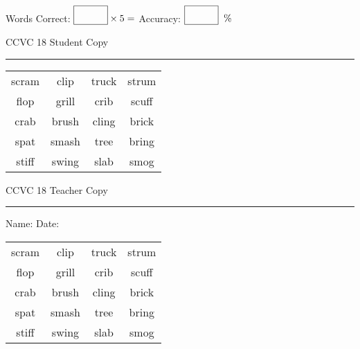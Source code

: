 \documentclass{memoir}
\begin{document}
\normalsize

Words Correct: $\fbox{\phantom{\huge 100}} \times 5 = $ Accuracy: $\fbox{\phantom{\huge 100}}\;\; \%$ 

\vfill

\newpage


\footnotesize \noindent
CCVC 18 \hfill Student Copy
\smallskip
\hrule

\Large

\setlength{\tabcolsep}{14pt}
\def\arraystretch{3}

{\selectfont


\begin{vplace}[0.5]
\begin{center}
\begin{tabular}{cccc}
scram & clip & truck & strum \\
flop & grill            & crib & scuff \\
crab        & brush & cling & brick       \\
spat            & smash & tree & bring      \\
stiff & swing & slab             & smog \\
\end{tabular}
\end{center}
\end{vplace}

}

\newpage

\footnotesize \noindent
CCVC 18 \hfill Teacher Copy
\smallskip
\hrule

\normalsize

\vfill

\noindent
Name: \underline{\hspace{1.75in}} \hfill Date: \underline{\hspace{1in}}

\Large

{\selectfont


\begin{vplace}[0.5]
\begin{center}
\begin{tabular}{cccc}
scram & clip & truck & strum \\
flop & grill            & crib & scuff \\
crab        & brush & cling & brick       \\
spat            & smash & tree & bring      \\
stiff & swing & slab             & smog \\
\end{tabular}
\end{center}
\end{vplace}



}
\end{document}
